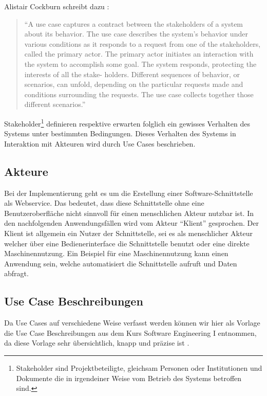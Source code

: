 Alistair Cockburn schreibt dazu \citep[Vergl.][Kap. 1.1]{cockburn2000}:

\begin{quotation}
\enquote{A use case captures a contract between the stakeholders of a system about its behavior. The use case describes the system’s behavior under various conditions as it responds to a request from one of the stakeholders, called the primary actor. The primary actor initiates an interaction with the system to accomplish some goal. The system responds, protecting the interests of all the stake- holders. Different sequences of behavior, or scenarios, can unfold, depending on the particular requests made and conditions surrounding the requests. The use case collects together those different scenarios.}
\end{quotation}

\gls{Stakeholder}\footnote{Stakeholder sind Projektbeteiligte, gleichsam Personen oder Institutionen und Dokumente die in irgendeiner Weise vom Betrieb des Systems betroffen sind.} definieren respektive erwarten folglich ein gewisses Verhalten des Systems unter bestimmten Bedingungen. Dieses Verhalten des Systems in Interaktion mit Akteuren wird durch \glspl{Use Case} beschrieben.


\subsection{Akteure}
Bei der Implementierung geht es um die Erstellung einer Software-Schnittstelle als \gls{Webservice}. Das bedeutet, dass diese Schnittstelle ohne eine Benutzeroberfläche nicht sinnvoll für einen menschlichen Akteur nutzbar ist. In den nachfolgenden Anwendungsfällen wird vom Akteur \enquote{Klient} gesprochen. Der Klient ist allgemein ein Nutzer der Schnittstelle, sei es als menschlicher Akteur welcher über eine Bedienerinterface die Schnittstelle benutzt oder eine direkte Maschinennutzung. Ein Beispiel für eine Maschinennutzung kann einen Anwendung sein, welche automatisiert die Schnittstelle aufruft und Daten abfragt.    

\subsection{Use Case Beschreibungen}

Da \glspl{Use Case} auf verschiedene Weise verfasst werden können wir hier als Vorlage die \gls{Use Case} Beschreibungen aus dem Kurs Software Engineering I entnommen, da diese Vorlage sehr übersichtlich, knapp und präzise ist \citep[Vgl.][S. 120ff]{sixse1}. 

